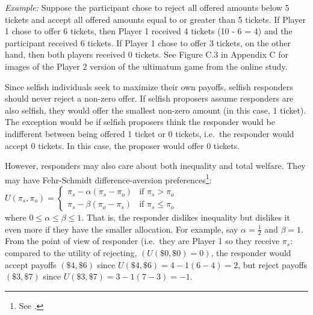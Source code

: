 \documentclass[12pt]{article}
\begin{document}
\textit{Example:} Suppose the participant chose to reject all offered amounts below 5 tickets and accept all offered amounts equal to or greater than 5 tickets. If Player 1 chose to offer 6 tickets, then Player 1 received 4 tickets (10 - 6 = 4) and the participant received 6 tickets. If Player 1 chose to offer 3 tickets, on the other hand, then both players received 0 tickets. See Figure C.3 in Appendix C for images of the Player 2 version of the ultimatum game from the online study.

Since selfish individuals seek to maximize their own payoffs, selfish responders should never reject a non-zero offer. If selfish proposers assume responders are also selfish, they would offer the smallest non-zero amount (in this case, 1 ticket). The exception would be if selfish proposers think the responder would be indifferent between being offered 1 ticket or 0 tickets, i.e.\ the responder would accept 0 tickets. In this case, the proposer would offer 0 tickets.


However, responders may also care about both inequality and total welfare. They may have Fehr-Schmidt difference-aversion preferences\footnote{See \cite{fehr_schmidt_1999}.}:\\

$ U(\pi_{s}, \pi_{o})  = \begin{cases}
      \pi_{s} - \alpha(\pi_{s} - \pi_{o}) & \text{if }\pi_{s} > \pi_{o} \\
      \pi_{s} - \beta(\pi_{o} - \pi_{s}) & \text{if }\pi_{s} \leq \pi_{o}
    \end{cases}\, $ \\

\noindent where $ 0 \leq \alpha \leq \beta \leq 1$. That is, the responder dislikes inequality but dislikes it even more if they have the smaller allocation. For example, say $\alpha = \frac{1}{2}$ and $\beta=1$. From the point of view of responder (i.e.\ they are Player 1 so they receive \(\pi_{s}\): compared to the utility of rejecting, \((U(\$0, \$0) = 0)\), the responder would accept payoffs \((\$4, \$6)\) since \(U(\$4, \$6) = 4 - 1(6 - 4) =  2\), but reject payoffs \((\$3, \$7)\) since \(U(\$3,  \$7) = 3 - 1(7 - 3) = -1\).
\end{document}
